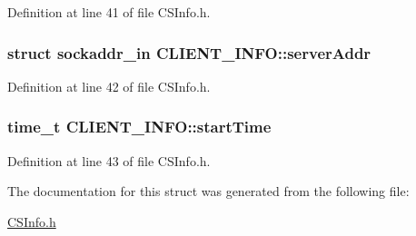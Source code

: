 Definition at line 41 of file CSInfo.h.\hypertarget{structCLIENT__INFO_a22dc8471fb33af605823073b76053bb4}{
\subsubsection[{serverAddr}]{\setlength{\rightskip}{0pt plus 5cm}struct sockaddr\_\-in {\bf CLIENT\_\-INFO::serverAddr}}}
\label{structCLIENT__INFO_a22dc8471fb33af605823073b76053bb4}


Definition at line 42 of file CSInfo.h.\hypertarget{structCLIENT__INFO_a43b151ec941fff4ce26459dc601f0987}{
\subsubsection[{startTime}]{\setlength{\rightskip}{0pt plus 5cm}time\_\-t {\bf CLIENT\_\-INFO::startTime}}}
\label{structCLIENT__INFO_a43b151ec941fff4ce26459dc601f0987}


Definition at line 43 of file CSInfo.h.

The documentation for this struct was generated from the following file:\begin{DoxyCompactItemize}
\item 
\hyperlink{CSInfo_8h}{CSInfo.h}\end{DoxyCompactItemize}
